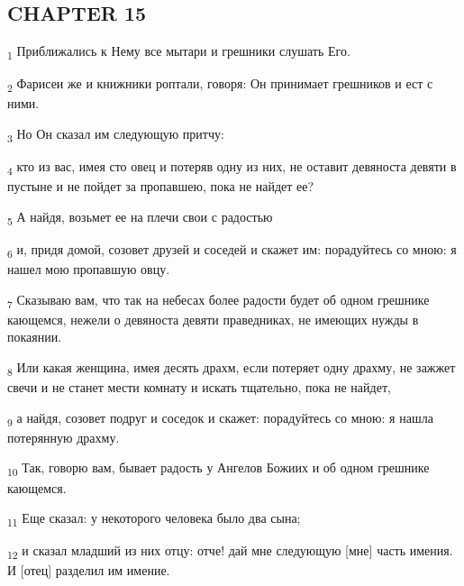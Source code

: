 \subsection{CHAPTER 15}
\begin{tcolorbox}
\textsubscript{1} Приближались к Нему все мытари и грешники слушать Его.
\end{tcolorbox}
\begin{tcolorbox}
\textsubscript{2} Фарисеи же и книжники роптали, говоря: Он принимает грешников и ест с ними.
\end{tcolorbox}
\begin{tcolorbox}
\textsubscript{3} Но Он сказал им следующую притчу:
\end{tcolorbox}
\begin{tcolorbox}
\textsubscript{4} кто из вас, имея сто овец и потеряв одну из них, не оставит девяноста девяти в пустыне и не пойдет за пропавшею, пока не найдет ее?
\end{tcolorbox}
\begin{tcolorbox}
\textsubscript{5} А найдя, возьмет ее на плечи свои с радостью
\end{tcolorbox}
\begin{tcolorbox}
\textsubscript{6} и, придя домой, созовет друзей и соседей и скажет им: порадуйтесь со мною: я нашел мою пропавшую овцу.
\end{tcolorbox}
\begin{tcolorbox}
\textsubscript{7} Сказываю вам, что так на небесах более радости будет об одном грешнике кающемся, нежели о девяноста девяти праведниках, не имеющих нужды в покаянии.
\end{tcolorbox}
\begin{tcolorbox}
\textsubscript{8} Или какая женщина, имея десять драхм, если потеряет одну драхму, не зажжет свечи и не станет мести комнату и искать тщательно, пока не найдет,
\end{tcolorbox}
\begin{tcolorbox}
\textsubscript{9} а найдя, созовет подруг и соседок и скажет: порадуйтесь со мною: я нашла потерянную драхму.
\end{tcolorbox}
\begin{tcolorbox}
\textsubscript{10} Так, говорю вам, бывает радость у Ангелов Божиих и об одном грешнике кающемся.
\end{tcolorbox}
\begin{tcolorbox}
\textsubscript{11} Еще сказал: у некоторого человека было два сына;
\end{tcolorbox}
\begin{tcolorbox}
\textsubscript{12} и сказал младший из них отцу: отче! дай мне следующую [мне] часть имения. И [отец] разделил им имение.
\end{tcolorbox}
